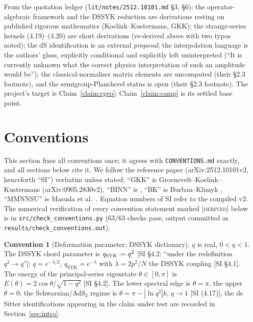 \documentclass[11pt,a4paper]{article}
\providecommand{\coloneqq}{\mathrel{\vcenter{\baselineskip0.5ex \lineskiplimit0pt
      \hbox{\scriptsize.}\hbox{\scriptsize.}}}=}
\newcommand{\DERIVED}{{\color{teal}\textsc{[derived]}}}
\theoremstyle{definition}
\newtheorem{convention}[definition]{Convention}
\theoremstyle{plain}
\begin{document}
From the quotation ledger (\texttt{lit/notes/2512.10101.md} \S3, \S6): the operator-algebraic
framework and the DSSYK reduction are derivations resting on published rigorous mathematics
(Koelink--Kustermans, GKK); the strange-series kernels (4.19)--(4.20) are short derivations
(re-derived above with two typos noted); the dS identification is an external
\emph{proposal}; the interpolation language is the authors' gloss, explicitly conditional and
explicitly left uninterpreted (``It is currently unknown what the correct physics interpretation
of such an amplitude would be''); the classical-normaliser matrix elements are uncomputed
(their \S2.3 footnote), and the semigroup-Plancherel status is open (their \S2.3 footnote).
The project's target is Claim~\ref{claim:cgeo}; Claim~\ref{claim:camp} is its settled base
point.

\section{Conventions}
\label{sec:conventions}


This section fixes all conventions once; it agrees with \texttt{CONVENTIONS.md} exactly, and all
sections below cite it. We follow the reference paper \cite{Schouten:2025dssyk} (arXiv:2512.10101v2,
henceforth ``SI'') verbatim unless stated; ``GKK'' is Groenevelt--Koelink--Kustermans
\cite{Groenevelt:2009gkk} (arXiv:0905.2830v2), ``BINN'' is \cite{Berkooz:2022qgroup}, ``BK'' is
Burban--Klimyk \cite{Burban:1993bk}, ``MMNNSU'' is Masuda et al.\ \cite{Masuda:1990mmnnsu}.
Equation numbers of SI refer to the compiled v2.
The numerical verification of every convention statement marked \DERIVED{} below is in
\texttt{src/check\_conventions.py} (63/63 checks pass; output committed as
\texttt{results/check\_conventions.out}).

\begin{convention}[Deformation parameter; DSSYK dictionary]\label{conv:q}
$q$ is real, $0<q<1$. The DSSYK chord parameter is $q_{\mathrm{SYK}}\coloneqq q^{2}$
[SI \S4.2: ``under the redefinition $q^2\to q$'']; $q=e^{-\lambda/2}$, $q_{\mathrm{SYK}}
=e^{-\lambda}$ with $\lambda=2p^{2}/N$ the DSSYK coupling [SI \S4.1]. The energy of the
principal-series eigenstate $\theta\in[0,\pi]$ is $E(\theta)=2\cos\theta/\sqrt{1-q^{2}}$
[SI \S4.2]. The lower spectral edge is $\theta=\pi$, the upper $\theta=0$; the Schwarzian/AdS$_2$
regime is $\theta=\pi-|{\ln q^{2}}|k$, $q\to1$ [SI (4.17)]; the de Sitter identifications
appearing in the claim under test are recorded in Section~\ref{sec:intro}.
\end{convention}
\end{document}
